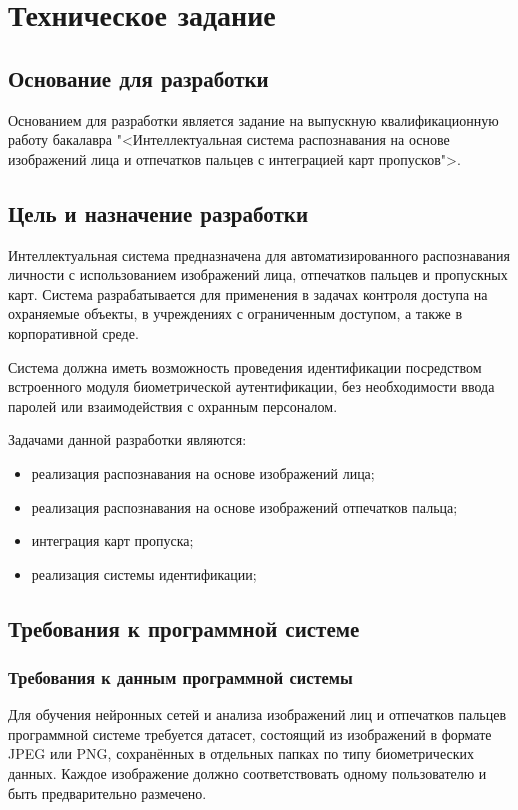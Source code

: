 \section{Техническое задание}
\subsection{Основание для разработки}

Основанием для разработки является задание на выпускную квалификационную работу бакалавра "<Интеллектуальная система распознавания на основе изображений лица и отпечатков пальцев с интеграцией карт пропусков">.

\subsection{Цель и назначение разработки}

Интеллектуальная система предназначена для автоматизированного распознавания личности с использованием изображений лица, отпечатков пальцев и пропускных карт. Система разрабатывается для применения в задачах контроля доступа на охраняемые объекты, в учреждениях с ограниченным доступом, а также в корпоративной среде.

Система должна иметь возможность проведения идентификации посредством встроенного модуля биометрической аутентификации, без необходимости ввода паролей или взаимодействия с охранным персоналом.

Задачами данной разработки являются:
\begin{itemize}
\item реализация распознавания на основе изображений лица;
\item реализация распознавания на основе изображений отпечатков пальца;
\item интеграция карт пропуска;
\item реализация системы идентификации;
\end{itemize}

\subsection{Требования к программной системе}

\subsubsection{Требования к данным программной системы}

Для обучения нейронных сетей и анализа изображений лиц и отпечатков пальцев программной системе требуется датасет, состоящий из изображений в формате JPEG или PNG, сохранённых в отдельных папках по типу биометрических данных. Каждое изображение должно соответствовать одному пользователю и быть предварительно размечено.

